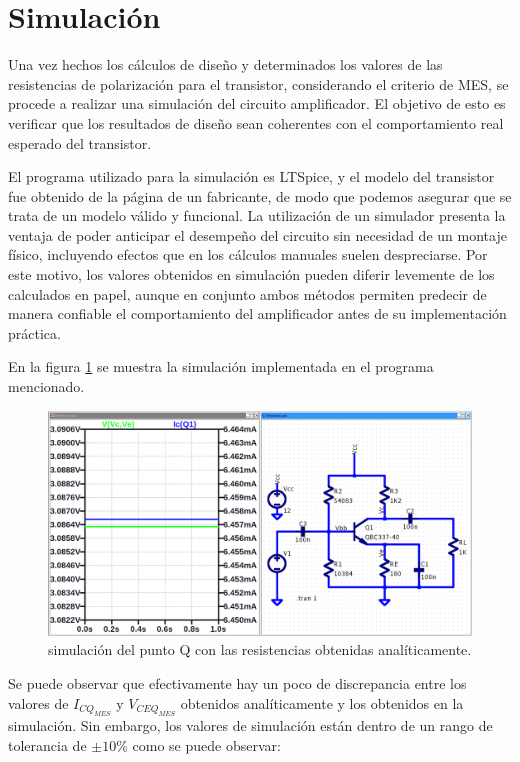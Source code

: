 \section{Simulación}

Una vez hechos los cálculos de diseño y determinados los valores de las resistencias de polarización para el transistor,
considerando el criterio de MES, se procede a realizar una simulación del circuito amplificador. El objetivo de esto es
verificar que los resultados de diseño sean coherentes con el comportamiento real esperado del transistor.

El programa utilizado para la simulación es LTSpice, y el modelo del transistor fue obtenido de la página de un
fabricante, de modo que podemos asegurar que se trata de un modelo válido y funcional. La utilización de un simulador
presenta la ventaja de poder anticipar el desempeño del circuito sin necesidad de un montaje físico, incluyendo
efectos que en los cálculos manuales suelen despreciarse. Por este motivo, los valores obtenidos en simulación pueden
diferir levemente de los calculados en papel, aunque en conjunto ambos métodos permiten predecir de manera confiable el
comportamiento del amplificador antes de su implementación práctica.

En la figura \ref{fig:pto_q_ideal} se muestra la simulación implementada en el programa
mencionado.

\begin{figure}[!ht]
    \centering
    \includegraphics[width=0.9\linewidth]{images/pto_q_ideal.png}
    \caption{simulación del punto Q con las resistencias obtenidas analíticamente.}
    \label{fig:pto_q_ideal}
\end{figure}

Se puede observar que efectivamente hay un poco de discrepancia entre los valores de
$I_{CQ_{MES}}$ y $V_{CEQ_{MES}}$ obtenidos analíticamente y los obtenidos en la simulación.
Sin embargo, los valores de simulación están dentro de un rango de tolerancia de $\pm10\%$
como se puede observar:

